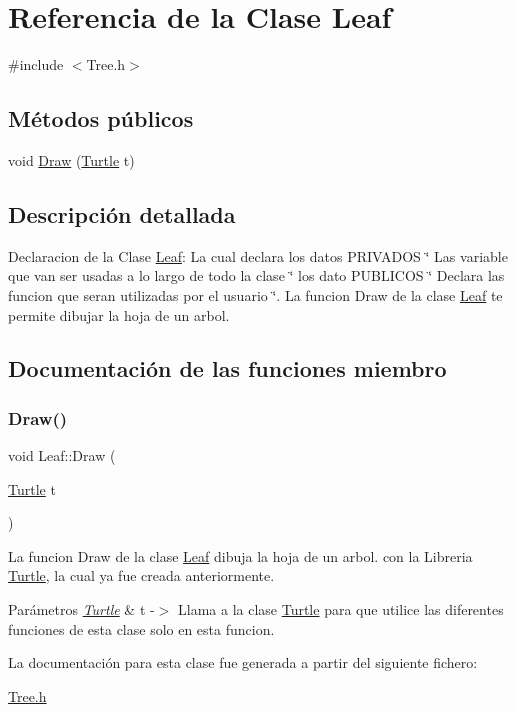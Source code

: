 \hypertarget{class_leaf}{}\section{Referencia de la Clase Leaf}
\label{class_leaf}


{\ttfamily \#include $<$Tree.\+h$>$}

\subsection*{Métodos públicos}
\begin{DoxyCompactItemize}
\item 
void \mbox{\hyperlink{class_leaf_acae56c352e11e0c321faad0db0702359}{Draw}} (\mbox{\hyperlink{class_turtle}{Turtle}} t)
\end{DoxyCompactItemize}


\subsection{Descripción detallada}
Declaracion de la Clase \mbox{\hyperlink{class_leaf}{Leaf}}\+: La cual declara los datos P\+R\+I\+V\+A\+D\+OS \char`\"{} Las variable que van ser usadas a lo largo de todo la clase \char`\"{} los dato P\+U\+B\+L\+I\+C\+OS \char`\"{} Declara las funcion que seran utilizadas por el usuario \char`\"{}. La funcion Draw de la clase \mbox{\hyperlink{class_leaf}{Leaf}} te permite dibujar la hoja de un arbol. 

\subsection{Documentación de las funciones miembro}
\mbox{\label{class_leaf_acae56c352e11e0c321faad0db0702359}} 
\subsubsection{\texorpdfstring{Draw()}{Draw()}}
{\footnotesize\ttfamily void Leaf\+::\+Draw (\begin{DoxyParamCaption}\item[{\mbox{\hyperlink{class_turtle}{Turtle}}}]{t }\end{DoxyParamCaption})\hspace{0.3cm}{\ttfamily [inline]}}

La funcion Draw de la clase \mbox{\hyperlink{class_leaf}{Leaf}} dibuja la hoja de un arbol. con la Libreria \mbox{\hyperlink{class_turtle}{Turtle}}, la cual ya fue creada anteriormente.
\begin{DoxyParams}{Parámetros}
{\em \mbox{\hyperlink{class_turtle}{Turtle}}} & t -\/$>$ Llama a la clase \mbox{\hyperlink{class_turtle}{Turtle}} para que utilice las diferentes funciones de esta clase solo en esta funcion. \\
\hline
\end{DoxyParams}


La documentación para esta clase fue generada a partir del siguiente fichero\+:\begin{DoxyCompactItemize}
\item 
\mbox{\hyperlink{_tree_8h}{Tree.\+h}}\end{DoxyCompactItemize}
